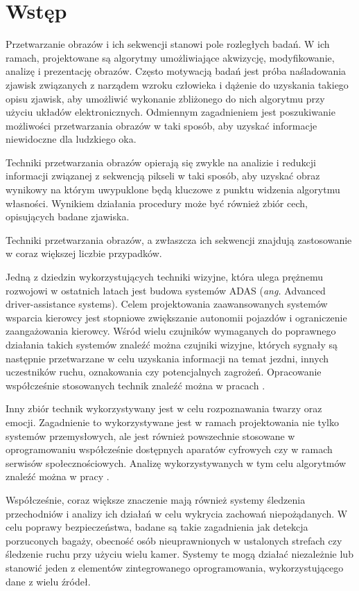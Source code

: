 \chapter{Wstęp}
\label{cha:intruduction}

Przetwarzanie obrazów i ich sekwencji stanowi pole rozległych badań. W ich ramach, projektowane są algorytmy umożliwiające akwizycję, modyfikowanie, analizę i prezentację obrazów. Często motywacją badań jest próba naśladowania zjawisk związanych z narządem wzroku człowieka i dążenie do uzyskania takiego opisu zjawisk, aby umożliwić wykonanie zbliżonego do nich algorytmu przy użyciu układów elektronicznych. Odmiennym zagadnieniem jest poszukiwanie możliwości przetwarzania obrazów w taki sposób, aby uzyskać informacje niewidoczne dla ludzkiego oka.

Techniki przetwarzania obrazów opierają się zwykle na analizie i redukcji informacji związanej z sekwencją pikseli w taki sposób, aby uzyskać obraz wynikowy na którym uwypuklone będą kluczowe z punktu widzenia algorytmu własności. Wynikiem działania procedury może być również zbiór cech, opisujących badane zjawiska.

Techniki przetwarzania obrazów, a zwłaszcza ich sekwencji znajdują zastosowanie w coraz większej liczbie przypadków.

Jedną z dziedzin wykorzystujących techniki wizyjne, która ulega prężnemu rozwojowi w ostatnich latach jest budowa systemów ADAS (\emph{ang.} Advanced driver-assistance systems). Celem projektowania zaawansowanych systemów wsparcia kierowcy jest stopniowe zwiększanie autonomii pojazdów i ograniczenie zaangażowania kierowcy. Wśród wielu czujników wymaganych do poprawnego działania takich systemów znaleźć można czujniki wizyjne, których sygnały są następnie przetwarzane w celu uzyskania informacji na temat jezdni, innych uczestników ruchu, oznakowania czy potencjalnych zagrożeń. Opracowanie współcześnie stosowanych technik znaleźć można w pracach \cite{Bengler2014,Velez2017}.

Inny zbiór technik wykorzystywany jest w celu rozpoznawania twarzy oraz emocji. Zagadnienie to wykorzystywane jest w ramach projektowania nie tylko systemów przemysłowych, ale jest również powszechnie stosowane w oprogramowaniu współcześnie dostępnych aparatów cyfrowych czy w ramach serwisów społecznościowych. Analizę wykorzystywanych w tym celu algorytmów znaleźć można w pracy \cite{Anil2016}.

Współcześnie, coraz większe znaczenie mają również systemy śledzenia przechodniów i analizy ich działań w celu wykrycia zachowań niepożądanych. W celu poprawy bezpieczeństwa, badane są takie zagadnienia jak detekcja porzuconych bagaży, obecność osób nieuprawnionych w ustalonych strefach czy śledzenie ruchu przy użyciu wielu kamer. Systemy te mogą działać niezależnie lub stanowić jeden z elementów zintegrowanego oprogramowania, wykorzystującego dane z wielu źródeł. \cite{Sriram2016,Hussain2016,Gouo2015}

